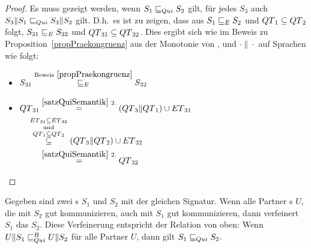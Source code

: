 \begin{proof}
  Es muss gezeigt werden, wenn $S_1\sqsubseteq _{Qui} S_2$ gilt, für jedes $S_3$ auch
  $S_3\|S_1\sqsubseteq _{Qui} S_3\|S_2$ gilt. D.h.\ es ist zu zeigen, dass aus $S_1\sqsubseteq _E
  S_2$ und $QT{}_1\subseteq QT{}_2$ folgt, $S_{31}\sqsubseteq _E S_{32}$ und
  $QT{}_{31}\subseteq QT{}_{32}$. Dies ergibt sich wie im Beweis zu
  Proposition~\ref{propPraekongruenz} aus der Monotonie von \cont{}, \prune{}
  und $\cdot\|\cdot$ auf Sprachen wie folgt:
  \begin{itemize}
    \item $\begin{aligned}[t]
        S_{31} \overset{\mathrm{Beweis}~\ref{propPraekongruenz}}{\sqsubseteq _E} S_{32}
    \end{aligned}$
    \item $\begin{aligned}[t]
        \QT{}_{31} &\overset{\ref{satzQuiSemantik}~2.}{=}
        (\QT{}_3\|\QT{}_1)\cup \ET{}_{31}\\
        &\hspace{-0.5cm}\overset{\ET{}_{31}\subseteq
      \ET{}_{32}}{\overset{\mathrm{und}}{\overset{\QT{}_1\subseteq
      \QT{}_2}{\subseteq}}} (\QT{}_3\|\QT{}_2) \cup \ET{}_{32}\\
        &\overset{\ref{satzQuiSemantik}~2.}{=} \QT{}_{32}
    \end{aligned}$
  \end{itemize}
\end{proof}

\begin{lem}
  \label{lemQuiVerfeinerung}
  Gegeben sind zwei \EIO{}s $S_1$ und $S_2$ mit der gleichen Signatur. Wenn
  alle Partner \EIO{}s $U$, die mit $S_2$  gut kommunizieren, auch mit $S_1$
  gut kommunizieren, dann verfeinert $S_1$ das \EIO{} $S_2$. Diese Verfeinerung
  entspricht der Relation \QRel{} von oben: Wenn $U\|S_1\sqsubseteq _{Qui}^B U\|S_2$ für alle
  Partner $U$, dann gilt $S_1\sqsubseteq _{Qui} S_2$.
\end{lem}

